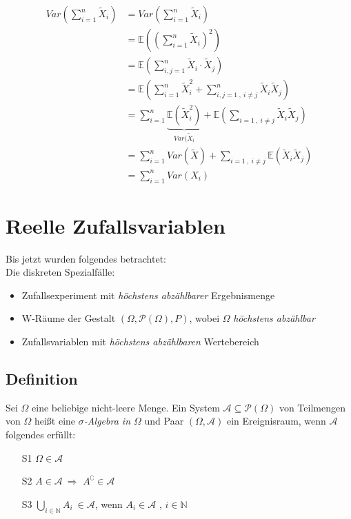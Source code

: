 \documentclass[12pt,a4paper]{article}
\begin{document}
	\begin{align*}
	Var\left(\sum_{i=1}^n \tilde{X}_i\right) &= Var\left(\sum_{i=1}^n \tilde{X}_i\right)\\
	&= \mathbb{E}\left(\left(\sum_{i=1}^n \tilde{X}_i \right)^2 \right)\\
	&= \mathbb{E}\left(\sum_{i,j=1}^n \tilde{X}_i \cdot \tilde{X}_j\right)\\
	&= \mathbb{E}\left(\sum_{i=1}^n \tilde{X}_i^2 + \sum_{i,j=1\: , \: i\neq j}^n  \tilde{X}_i \tilde{X}_j\right)\\
	&= \sum_{i=1}^n \underbrace{\mathbb{E}\left(\tilde{X}_i^2\right)}_{Var(\tilde{X}_i} + \mathbb{E}\left(\sum_{i=1\: , \: i\neq j} \tilde{X}_i \tilde{X}_j\right)\\
	&= \sum_{i=1}^n Var(\tilde{X}) + \sum_{i=1\: , \: i\neq j}\mathbb{E}\left(\tilde{X}_i \tilde{X}_j\right)\\
	&= \sum_{i=1}^n Var(X_i) 
	\end{align*}
	 
	\section{Reelle Zufallsvariablen}
	Bis jetzt wurden folgendes betrachtet:\\
	Die diskreten Spezialfälle:
	\begin{itemize}
		\item Zufallsexperiment mit \emph{höchstens abzählbarer} Ergebnismenge
		\item W-Räume der Gestalt $(\Omega, \mathcal{P}(\Omega),P)$, wobei $\Omega$ \emph{höchstens abzählbar}
		\item Zufallsvariablen mit \emph{höchstens abzählbaren} Wertebereich
	\end{itemize}
	
	\subsection{Definition}
	Sei $\Omega$ eine beliebige nicht-leere Menge. Ein System $\mathcal{A}\subseteq\mathcal{P}(\Omega)$ von Teilmengen von $\Omega$ heißt eine \textit{$\sigma$-Algebra in $\Omega$} und Paar $(\Omega,\mathcal{A})$ ein Ereignisraum, wenn $\mathcal{A}$ folgendes erfüllt:
	\begin{itemize}
		\item[S1] $\Omega\in\mathcal{A}$
		\item[S2] $A\in\mathcal{A}\: \Rightarrow$ $A^\complement \in \mathcal{A}$
		\item[S3] $\bigcup_{i\in\mathbb{N}} A_i \: \in\mathcal{A}$, wenn $A_i\in\mathcal{A}$ , $i\in\mathbb{N}$ 
	\end{itemize}
	
\end{document}
